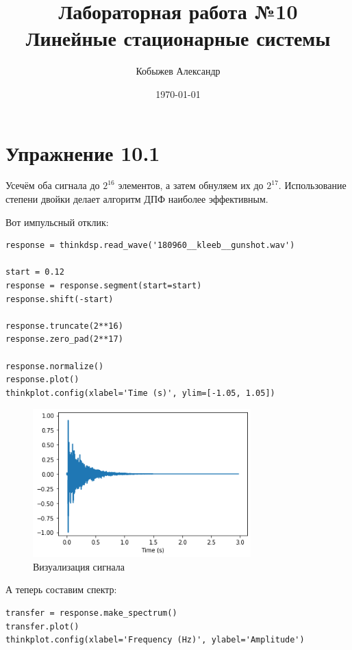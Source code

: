 \documentclass[a4paper,12pt]{report}
\title{Лабораторная работа №10\\Линейные стационарные системы}
\author{Кобыжев Александр}
\date{\today}
\begin{document}
\maketitle
\tableofcontents
\listoffigures
\lstlistoflistings

\maketitle

\chapter{Упражнение 10.1}

Усечём оба сигнала до $2^{16}$ элементов, а затем обнуляем их до $2^{17}$. Использование степени двойки делает алгоритм ДПФ наиболее эффективным.

Вот импульсный отклик:

\begin{lstlisting}[caption=Усечение сигнала]
response = thinkdsp.read_wave('180960__kleeb__gunshot.wav')

start = 0.12
response = response.segment(start=start)
response.shift(-start)

response.truncate(2**16)
response.zero_pad(2**17)

response.normalize()
response.plot()
thinkplot.config(xlabel='Time (s)', ylim=[-1.05, 1.05])
\end{lstlisting}

\begin{figure}[H]
        \centering
        \includegraphics[width=0.75\textwidth]{lab10_fig1_1.png}
        \caption{Визуализация сигнала}
        \label{fig:lab10_fig1_1}
\end{figure}

А теперь составим спектр:

\begin{lstlisting}[caption=Спектр сигнала]
transfer = response.make_spectrum()
transfer.plot()
thinkplot.config(xlabel='Frequency (Hz)', ylabel='Amplitude')
\end{lstlisting}
\end{document}
